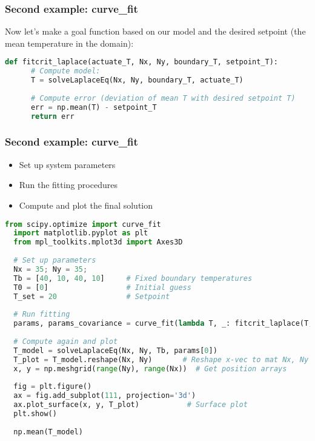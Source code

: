   \begin{frame}[fragile] 
    \frametitle{Second example: curve\_fit}
    Now let's make a goal function based on our model and the desired setpoint (the mean temperature in the domain):
    
    \begin{lstlisting}[language=Python]
  def fitcrit_laplace(actuate_T, Nx, Ny, boundary_T, setpoint_T):
      # Compute model:
      T = solveLaplaceEq(Nx, Ny, boundary_T, actuate_T)
      
      # Compute error (deviation of mean T with desired setpoint T)
      err = np.mean(T) - setpoint_T
      return err
    \end{lstlisting}
  \end{frame}  

  \begin{frame}[fragile] 
    \frametitle{Second example: curve\_fit}
    \begin{itemize}
      \item Set up system parameters
      \item Run the fitting procedures
      \item Compute and plot the final solution
    \end{itemize}
    
    \begin{lstlisting}[language=Python,basicstyle=\tiny]
  from scipy.optimize import curve_fit
  import matplotlib.pyplot as plt
  from mpl_toolkits.mplot3d import Axes3D
  
  # Set up parameters
  Nx = 35; Ny = 35;
  Tb = [40, 10, 40, 10]     # Fixed boundary temperatures
  T0 = [0]                  # Initial guess 
  T_set = 20                # Setpoint
  
  # Run fitting
  params, params_covariance = curve_fit(lambda T, _: fitcrit_laplace(T, Nx, Ny, Tb, T_set), [0], [0], p0=T0)
  
  # Compute again and plot
  T_model = solveLaplaceEq(Nx, Ny, Tb, params[0])
  T_plot = T_model.reshape(Nx, Ny)       # Reshape x-vec to mat Nx, Ny
  x, y = np.meshgrid(range(Ny), range(Nx))  # Get position arrays
  
  fig = plt.figure()
  ax = fig.add_subplot(111, projection='3d')
  ax.plot_surface(x, y, T_plot)           # Surface plot
  plt.show()
  
  np.mean(T_model)
    \end{lstlisting}
  \end{frame}
  




